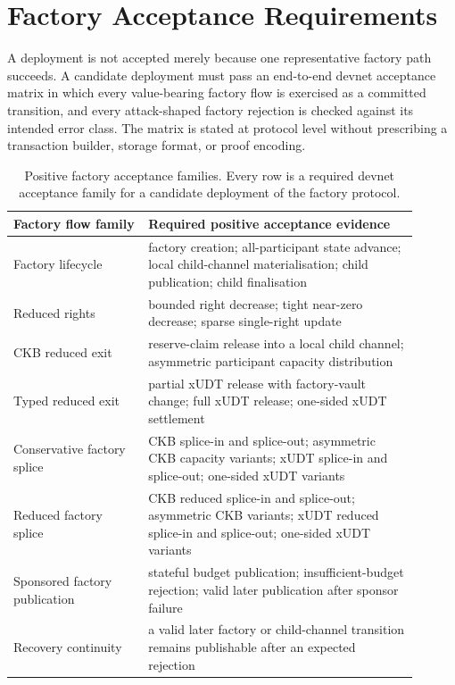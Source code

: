 \documentclass[a4paper,11pt]{article}
\begin{document}
\clearpage
\section{Factory Acceptance Requirements}

A deployment is not accepted merely because one representative factory path
succeeds. A candidate deployment must pass an end-to-end devnet acceptance
matrix in which every value-bearing factory flow is exercised as a
committed transition, and every attack-shaped factory rejection is checked
against its intended error class. The matrix is stated at protocol level
without prescribing a transaction builder, storage format, or proof encoding.

\begin{table}[htbp]
\centering
\small
\setlength{\tabcolsep}{4pt}
\begin{tabular}{L{0.30\linewidth}L{0.60\linewidth}}
\toprule
Factory flow family & Required positive acceptance evidence \\
\midrule
Factory lifecycle & factory creation; all-participant state advance; local child-channel materialisation; child publication; child finalisation \\
Reduced rights & bounded right decrease; tight near-zero decrease; sparse single-right update \\
CKB reduced exit & reserve-claim release into a local child channel; asymmetric participant capacity distribution \\
Typed reduced exit & partial xUDT release with factory-vault change; full xUDT release; one-sided xUDT settlement \\
Conservative factory splice & CKB splice-in and splice-out; asymmetric CKB capacity variants; xUDT splice-in and splice-out; one-sided xUDT variants \\
Reduced factory splice & CKB reduced splice-in and splice-out; asymmetric CKB variants; xUDT reduced splice-in and splice-out; one-sided xUDT variants \\
Sponsored factory publication & stateful budget publication; insufficient-budget rejection; valid later publication after sponsor failure \\
Recovery continuity & a valid later factory or child-channel transition remains publishable after an expected rejection \\
\bottomrule
\end{tabular}
\caption{Positive factory acceptance families. Every row is a required devnet acceptance family for a candidate deployment of the factory protocol.}
\label{tab:factory-acceptance-positive}
\end{table}
\end{document}
